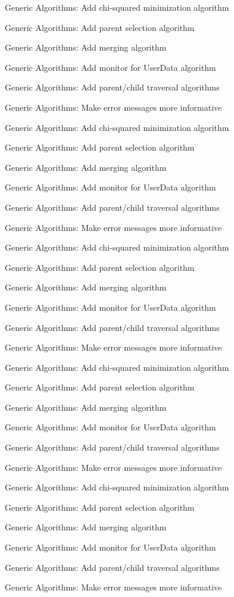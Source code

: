 \begin{DoxyRefList}
Generic Algorithms\+: Add chi-\/squared minimization algorithm 

Generic Algorithms\+: Add parent selection algorithm 

Generic Algorithms\+: Add merging algorithm 

Generic Algorithms\+: Add monitor for User\+Data algorithm 

Generic Algorithms\+: Add parent/child traversal algorithms 

Generic Algorithms\+: Make error messages more informative 

Generic Algorithms\+: Add chi-\/squared minimization algorithm 

Generic Algorithms\+: Add parent selection algorithm 

Generic Algorithms\+: Add merging algorithm 

Generic Algorithms\+: Add monitor for User\+Data algorithm 

Generic Algorithms\+: Add parent/child traversal algorithms 

Generic Algorithms\+: Make error messages more informative 

Generic Algorithms\+: Add chi-\/squared minimization algorithm 

Generic Algorithms\+: Add parent selection algorithm 

Generic Algorithms\+: Add merging algorithm 

Generic Algorithms\+: Add monitor for User\+Data algorithm 

Generic Algorithms\+: Add parent/child traversal algorithms 

Generic Algorithms\+: Make error messages more informative 

Generic Algorithms\+: Add chi-\/squared minimization algorithm 

Generic Algorithms\+: Add parent selection algorithm 

Generic Algorithms\+: Add merging algorithm 

Generic Algorithms\+: Add monitor for User\+Data algorithm 

Generic Algorithms\+: Add parent/child traversal algorithms 

Generic Algorithms\+: Make error messages more informative 

Generic Algorithms\+: Add chi-\/squared minimization algorithm 

Generic Algorithms\+: Add parent selection algorithm 

Generic Algorithms\+: Add merging algorithm 

Generic Algorithms\+: Add monitor for User\+Data algorithm 

Generic Algorithms\+: Add parent/child traversal algorithms 

Generic Algorithms\+: Make error messages more informative 
\end{DoxyRefList}